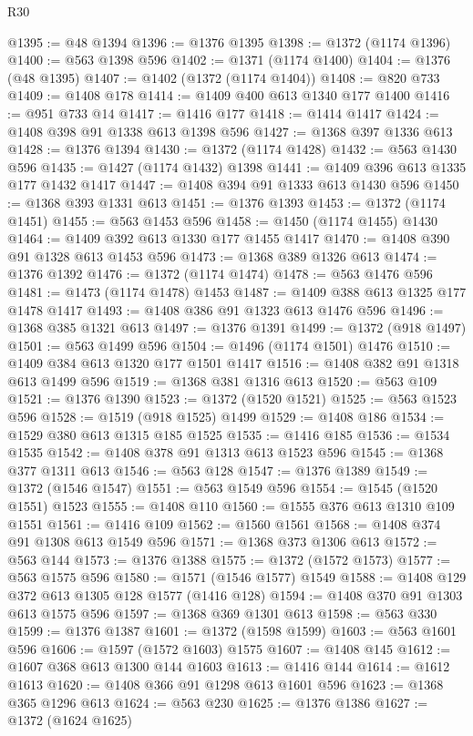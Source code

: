 \begin{lexlean}{R30}
\begin{coremodule}
@1395 := @48 @1394
@1396 := @1376 @1395
@1398 := @1372 (@1174 @1396)
@1400 := @563 @1398 @596
@1402 := @1371 (@1174 @1400)
@1404 := @1376 (@48 @1395)
@1407 := @1402 (@1372 (@1174 @1404))
@1408 := @820 @733
@1409 := @1408 @178
@1414 := @1409 @400 @613 @1340 @177 @1400
@1416 := @951 @733 @14
@1417 := @1416 @177
@1418 := @1414 @1417
@1424 := @1408 @398 @91 @1338 @613 @1398 @596
@1427 := @1368 @397 @1336 @613
@1428 := @1376 @1394
@1430 := @1372 (@1174 @1428)
@1432 := @563 @1430 @596
@1435 := @1427 (@1174 @1432) @1398
@1441 := @1409 @396 @613 @1335 @177 @1432 @1417
@1447 := @1408 @394 @91 @1333 @613 @1430 @596
@1450 := @1368 @393 @1331 @613
@1451 := @1376 @1393
@1453 := @1372 (@1174 @1451)
@1455 := @563 @1453 @596
@1458 := @1450 (@1174 @1455) @1430
@1464 := @1409 @392 @613 @1330 @177 @1455 @1417
@1470 := @1408 @390 @91 @1328 @613 @1453 @596
@1473 := @1368 @389 @1326 @613
@1474 := @1376 @1392
@1476 := @1372 (@1174 @1474)
@1478 := @563 @1476 @596
@1481 := @1473 (@1174 @1478) @1453
@1487 := @1409 @388 @613 @1325 @177 @1478 @1417
@1493 := @1408 @386 @91 @1323 @613 @1476 @596
@1496 := @1368 @385 @1321 @613
@1497 := @1376 @1391
@1499 := @1372 (@918 @1497)
@1501 := @563 @1499 @596
@1504 := @1496 (@1174 @1501) @1476
@1510 := @1409 @384 @613 @1320 @177 @1501 @1417
@1516 := @1408 @382 @91 @1318 @613 @1499 @596
@1519 := @1368 @381 @1316 @613
@1520 := @563 @109
@1521 := @1376 @1390
@1523 := @1372 (@1520 @1521)
@1525 := @563 @1523 @596
@1528 := @1519 (@918 @1525) @1499
@1529 := @1408 @186
@1534 := @1529 @380 @613 @1315 @185 @1525
@1535 := @1416 @185
@1536 := @1534 @1535
@1542 := @1408 @378 @91 @1313 @613 @1523 @596
@1545 := @1368 @377 @1311 @613
@1546 := @563 @128
@1547 := @1376 @1389
@1549 := @1372 (@1546 @1547)
@1551 := @563 @1549 @596
@1554 := @1545 (@1520 @1551) @1523
@1555 := @1408 @110
@1560 := @1555 @376 @613 @1310 @109 @1551
@1561 := @1416 @109
@1562 := @1560 @1561
@1568 := @1408 @374 @91 @1308 @613 @1549 @596
@1571 := @1368 @373 @1306 @613
@1572 := @563 @144
@1573 := @1376 @1388
@1575 := @1372 (@1572 @1573)
@1577 := @563 @1575 @596
@1580 := @1571 (@1546 @1577) @1549
@1588 := @1408 @129 @372 @613 @1305 @128 @1577 (@1416 @128)
@1594 := @1408 @370 @91 @1303 @613 @1575 @596
@1597 := @1368 @369 @1301 @613
@1598 := @563 @330
@1599 := @1376 @1387
@1601 := @1372 (@1598 @1599)
@1603 := @563 @1601 @596
@1606 := @1597 (@1572 @1603) @1575
@1607 := @1408 @145
@1612 := @1607 @368 @613 @1300 @144 @1603
@1613 := @1416 @144
@1614 := @1612 @1613
@1620 := @1408 @366 @91 @1298 @613 @1601 @596
@1623 := @1368 @365 @1296 @613
@1624 := @563 @230
@1625 := @1376 @1386
@1627 := @1372 (@1624 @1625)

\end{coremodule}
\end{lexlean}
